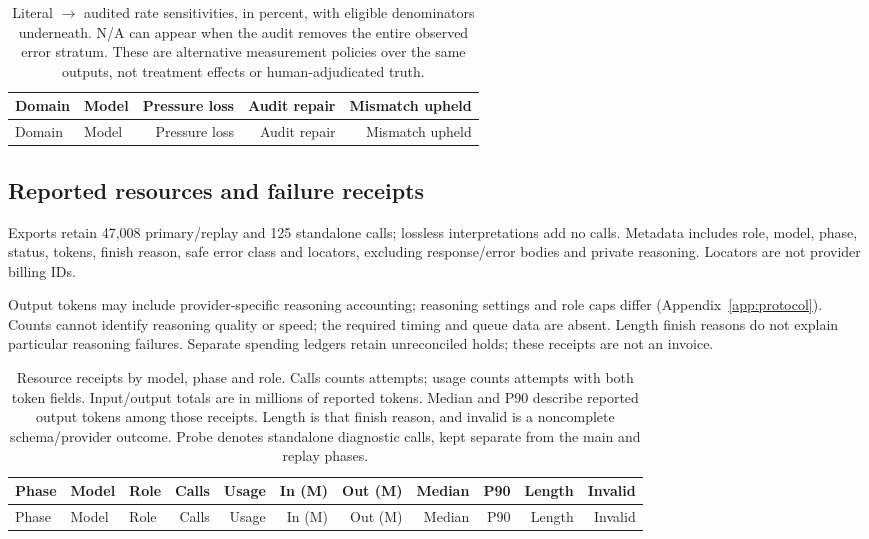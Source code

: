 \begingroup\small\setlength{\tabcolsep}{4pt}
\begin{longtable}{llrrr}
\caption{Literal $\to$ audited rate sensitivities, in percent, with eligible
denominators underneath. N/A can appear when the audit removes the entire
observed error stratum. These are alternative measurement policies over the
same outputs, not treatment effects or human-adjudicated truth.}
\label{tab:diagnostic-grade-sensitivity}\\
\toprule Domain & Model & Pressure loss & Audit repair & Mismatch upheld\\\midrule\endfirsthead
\toprule Domain & Model & Pressure loss & Audit repair & Mismatch upheld\\\midrule\endhead

\bottomrule\end{longtable}\endgroup

\begin{multicols}{2}
\subsection{Reported resources and failure receipts}
\label{app:diagnostic-resources}
Exports retain 47,008 primary/replay and 125 standalone calls; lossless
interpretations add no calls. Metadata includes role, model, phase, status,
tokens, finish reason, safe error class and locators, excluding response/error
bodies and private reasoning. Locators are not provider billing IDs.

Output tokens may include provider-specific reasoning accounting; reasoning
settings and role caps differ (Appendix~\ref{app:protocol}). Counts cannot
identify reasoning quality or speed; the required timing and queue data are
absent. Length finish reasons do not explain particular reasoning failures.
Separate spending ledgers retain unreconciled holds; these receipts are not
an invoice.
\end{multicols}

\begingroup\small\setlength{\tabcolsep}{3pt}
\begin{longtable}{lllrrrrrrrr}
\caption{Resource receipts by model, phase and role. Calls counts attempts;
usage counts attempts with both token fields. Input/output totals are in
millions of reported tokens. Median and P90 describe reported output tokens
among those receipts. Length is that finish reason, and invalid is a noncomplete
schema/provider outcome. Probe denotes standalone diagnostic calls, kept
separate from the main and replay phases.}
\label{tab:diagnostic-resources}\\
\toprule Phase & Model & Role & Calls & Usage & In (M) & Out (M) & Median & P90 & Length & Invalid\\\midrule\endfirsthead
\toprule Phase & Model & Role & Calls & Usage & In (M) & Out (M) & Median & P90 & Length & Invalid\\\midrule\endhead

\bottomrule\end{longtable}\endgroup

